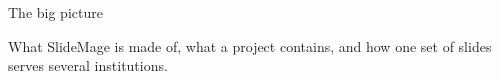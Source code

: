 

\begin{sectionframe}{The big picture}
	\begin{minipage}[t]{0.72\linewidth}\small
		What SlideMage is made of, what a project contains, and how one set of
		slides serves several institutions.
	\end{minipage}\par\medskip
	\SMChapterAgenda[0.72\linewidth]
\end{sectionframe}
